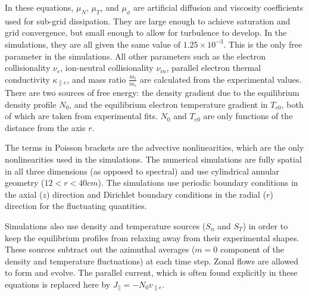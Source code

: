 \documentclass[showpacs,preprintnumbers,amsmath,amssymb,superscriptaddress]{revtex4}
\def\para{\parallel}
\newcommand{\vpe}{v_{\parallel e}}
\newcommand{\nue}{\nu_{e}}
\newcommand{\nuin}{\nu_{in}}
\newcommand{\kpe}{\kappa_{\parallel e}}
\newcommand{\fmie}{\frac{m_i}{m_e}}
\begin{document}
In these equations, $\mu_N$, $\mu_T$, and $\mu_\phi$ are artificial diffusion and viscosity coefficients used for sub-grid dissipation. They are large enough to achieve saturation
and grid convergence, but small enough to allow for turbulence to develop. In the simulations, they are all given the same value of $1.25 \times 10^{-3}$. This is the only free
parameter in the simulations. All other parameters such as the electron collisionality $\nue$, ion-neutral
collisionality $\nuin$, parallel electron thermal conductivity $\kpe$, and mass ratio $\fmie$ are calculated from the experimental values.
There are two sources of free energy: the density gradient due to the equilibrium density profile $N_0$, and the equilibrium electron temperature gradient in $T_{e0}$, both of which are
taken from experimental fits. $N_0$ and $T_{e0}$ are only functions of the distance from the axis $r$. 

The terms in Poisson brackets are the advective nonlinearities, which are the only nonlinearities used in the simulations.
The numerical simulations are fully spatial in all three dimensions (as opposed to spectral) and use cylindrical annular geometry ($12<r<40 cm$).
The simulations use periodic boundary conditions in the axial ($z$) direction and Dirichlet boundary
conditions in the radial ($r$) direction for the fluctuating quantities. 

Simulations also use density and temperature sources ($S_n$ and $S_T$) in order to keep the equilibrium profiles from relaxing away from their experimental shapes. 
These sources subtract out the azimuthal averages ($m=0$ component of the density and temperature fluctuations) at each time step. 
Zonal flows are allowed to form and evolve. The parallel current, which is often found explicitly in these equations is replaced here by $J_\para = - N_0 \vpe$. \\
\end{document}
